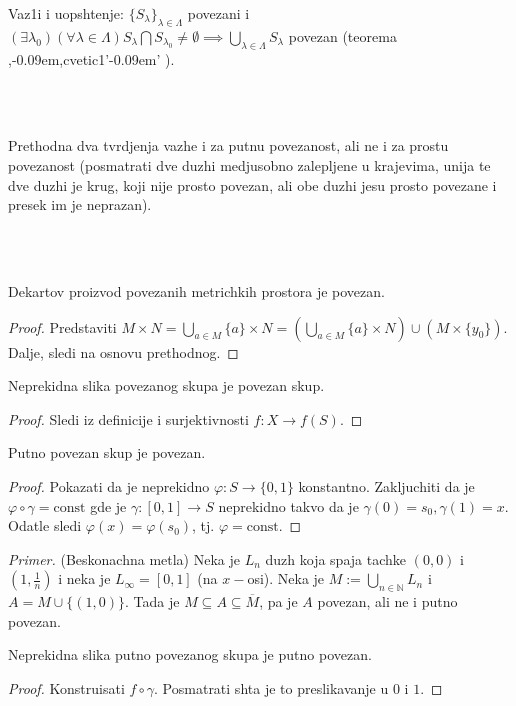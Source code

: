 \documentclass[a4paper,12pt]{article}
\newcommand{\NN}{\mathbb{N}}
\newcommand{\psj}{\subseteq}
\newcommand{\const}{\mathrm{const}}
\newcommand{\pr}{\noindent\textit{Primer.} }
\def\zn{,\kern-0.09em,} %
\def\zng{'\kern-0.09em' } %
\begin{document}
\begin{nap}
Vaz1i i uopshtenje: $\{S_{\lambda}\}_{\lambda \in \Lambda}$ povezani i $(\exists \lambda_0) (\forall \lambda \in \Lambda) S_{\lambda} \bigcap S_{\lambda_0} \ne \emptyset \implies \bigcup_{\lambda \in \Lambda} S_{\lambda}$ povezan (teorema \zn cvetic1\zng).
\end{nap}
\\ \\
\begin{nap}
	Prethodna dva tvrdjenja vazhe i za putnu povezanost, ali ne i za prostu povezanost (posmatrati dve duzhi medjusobno zalepljene u krajevima, unija te dve duzhi
	je krug, koji nije prosto povezan, ali obe duzhi jesu prosto povezane i presek im je neprazan).
\end{nap}
\\ \\
\begin{posl}
Dekartov proizvod povezanih metrichkih prostora je povezan.
\end{posl}
\begin{proof}
Predstaviti $M \times N = \bigcup_{a\in M} \{a\} \times N = (\bigcup_{a\in M} \{a\} \times N) \cup
(M \times  \{y_0\})$. Dalje, sledi na osnovu prethodnog.
\end{proof}

\begin{tvr}
Neprekidna slika povezanog skupa je povezan skup.
\end{tvr}
\begin{proof}
Sledi iz definicije i surjektivnosti $f: X \to f(S)$.
\end{proof}

\begin{tvr}
Putno povezan skup je povezan.
\end{tvr}
\begin{proof}
Pokazati da je neprekidno $\varphi: S \to \{0,1\}$ konstantno. Zakljuchiti da je $\varphi \circ \gamma = \const$ gde je $\gamma:[0,1] \to S$ neprekidno takvo da je $\gamma(0) = s_0, \gamma(1) = x$. Odatle sledi $\varphi(x) = \varphi(s_0)$, tj. $\varphi = \const$.
\end{proof}

\pr (Beskonachna metla) Neka je $L_n$ duzh koja spaja tachke $(0, 0)$ i $(1, \frac{1}{n})$ i neka je $L_\infty = [0, 1]$ (na $x-$osi). Neka je $M := \bigcup_{n \in \NN} L_n$ i
$ A  = M \cup \{(1, 0)\}$. Tada je $M \psj A \psj \overline M$, pa je $A$ povezan, ali ne i putno povezan.

\begin{tvr}
Neprekidna slika putno povezanog skupa je putno povezan.
\end{tvr}
\begin{proof}
Konstruisati $f \circ \gamma$. Posmatrati shta je to preslikavanje u $0$ i $1$.
\end{proof}
\end{document}
